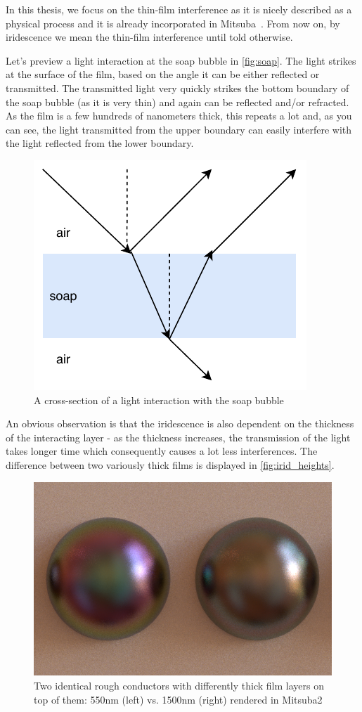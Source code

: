 In this thesis, we focus on the thin-film interference as it is nicely described as a physical process and it is already incorporated in Mitsuba~\cite{belcour2017practical}. From now on, by iridescence we mean the thin-film interference until told otherwise.

Let's preview a light interaction at the soap bubble in \autoref{fig:soap}. The light strikes at the surface of the film, based on the angle it can be either reflected or transmitted. The transmitted light very quickly strikes the bottom boundary of the soap bubble (as it is very thin) and again can be reflected and/or refracted. As the film is a few hundreds of nanometers thick, this repeats a lot and, as you can see, the light transmitted from the upper boundary can easily interfere with the light reflected from the lower boundary.

\begin{figure}[h]
	\centering
	\includegraphics[width=.6\linewidth]{img/soap.pdf}
	\caption{A cross-section of a light interaction with the soap bubble}
	\label{fig:soap}
\end{figure}

An obvious observation is that the iridescence is also dependent on the thickness of the interacting layer - as the thickness increases, the transmission of the light takes longer time which consequently causes a lot less interferences. The difference between two variously thick films is displayed in \autoref{fig:irid_heights}.

\begin{figure}[h]
	\centering
	\includegraphics[width=.6\linewidth]{img/irid_heights.png}
	\caption{Two identical rough conductors with differently thick film layers on top of them: 550nm (left) vs. 1500nm (right) rendered in Mitsuba2}
	\label{fig:irid_heights}
\end{figure}

